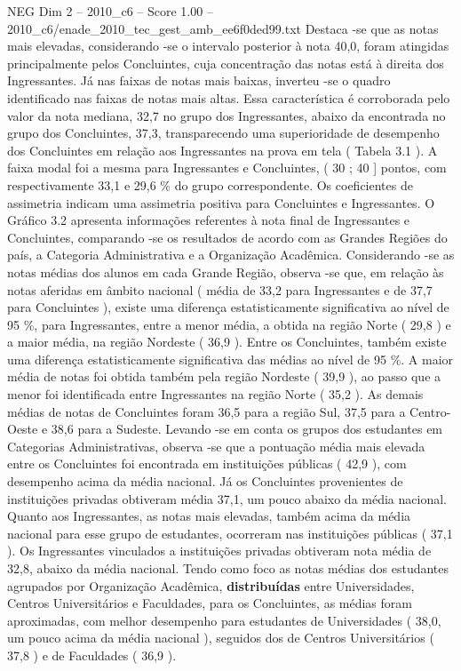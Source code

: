 \begin{textsample}{NEG Dim 2 – 2010\_c6 – Score 1.00 – 2010\_c6/enade\_2010\_tec\_gest\_amb\_ee6f0ded99.txt}
Destaca -se que as notas mais elevadas, considerando -se o intervalo posterior à nota 40,0, foram atingidas principalmente pelos Concluintes, cuja concentração das notas está à direita dos Ingressantes.
Já nas faixas de notas mais baixas, inverteu -se o quadro identificado nas faixas de notas mais altas.
Essa característica é corroborada pelo valor da nota mediana, 32,7 no grupo dos Ingressantes, abaixo da encontrada no grupo dos Concluintes, 37,3, transparecendo uma superioridade de desempenho dos Concluintes em relação aos Ingressantes na prova em tela ( Tabela 3.1 ).
A faixa modal foi a mesma para Ingressantes e Concluintes, ( 30 ; 40 ] pontos, com respectivamente 33,1 e 29,6 \% do grupo correspondente.
Os coeficientes de assimetria indicam uma assimetria positiva para Concluintes e Ingressantes.
O Gráfico 3.2 apresenta informações referentes à nota final de Ingressantes e Concluintes, comparando -se os resultados de acordo com as Grandes Regiões do país, a Categoria Administrativa e a Organização Acadêmica.
Considerando -se as notas médias dos alunos em cada Grande Região, observa -se que, em relação às notas aferidas em âmbito nacional ( média de 33,2 para Ingressantes e de 37,7 para Concluintes ), existe uma diferença estatisticamente significativa ao nível de 95 \%, para Ingressantes, entre a menor média, a obtida na região Norte ( 29,8 ) e a maior média, na região Nordeste ( 36,9 ).
Entre os Concluintes, também existe uma diferença estatisticamente significativa das médias ao nível de 95 \%.
A maior média de notas foi obtida também pela região Nordeste ( 39,9 ), ao passo que a menor foi identificada entre Ingressantes na região Norte ( 35,2 ).
As demais médias de notas de Concluintes foram 36,5 para a região Sul, 37,5 para a Centro-Oeste e 38,6 para a Sudeste.
Levando -se em conta os grupos dos estudantes em Categorias Administrativas, observa -se que a pontuação média mais elevada entre os Concluintes foi encontrada em instituições públicas ( 42,9 ), com desempenho acima da média nacional.
Já os Concluintes provenientes de instituições privadas obtiveram média 37,1, um pouco abaixo da média nacional.
Quanto aos Ingressantes, as notas mais elevadas, também acima da média nacional para esse grupo de estudantes, ocorreram nas instituições públicas ( 37,1 ).
Os Ingressantes vinculados a instituições privadas obtiveram nota média de 32,8, abaixo da média nacional.
Tendo como foco as notas médias dos estudantes agrupados por Organização Acadêmica, \textbf{distribuídas} entre Universidades, Centros Universitários e Faculdades, para os Concluintes, as médias foram aproximadas, com melhor desempenho para estudantes de Universidades ( 38,0, um pouco acima da média nacional ), seguidos dos de Centros Universitários ( 37,8 ) e de Faculdades ( 36,9 ).

\end{textsample}
